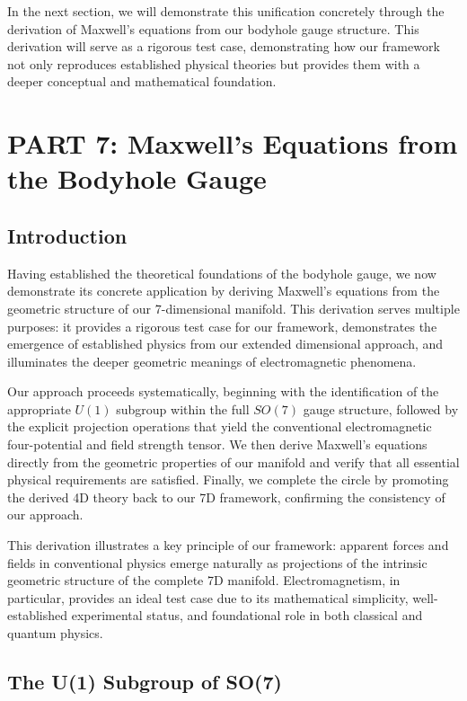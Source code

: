 \documentclass{article}
\begin{document}
In the next section, we will demonstrate this unification concretely through the derivation of Maxwell's equations from our bodyhole gauge structure. This derivation will serve as a rigorous test case, demonstrating how our framework not only reproduces established physical theories but provides them with a deeper conceptual and mathematical foundation.







\section{PART 7: Maxwell's Equations from the Bodyhole Gauge}

\subsection{Introduction}

Having established the theoretical foundations of the bodyhole gauge, we now demonstrate its concrete application by deriving Maxwell's equations from the geometric structure of our 7-dimensional manifold. This derivation serves multiple purposes: it provides a rigorous test case for our framework, demonstrates the emergence of established physics from our extended dimensional approach, and illuminates the deeper geometric meanings of electromagnetic phenomena.

Our approach proceeds systematically, beginning with the identification of the appropriate $U(1)$ subgroup within the full $SO(7)$ gauge structure, followed by the explicit projection operations that yield the conventional electromagnetic four-potential and field strength tensor. We then derive Maxwell's equations directly from the geometric properties of our manifold and verify that all essential physical requirements are satisfied. Finally, we complete the circle by promoting the derived 4D theory back to our 7D framework, confirming the consistency of our approach.

This derivation illustrates a key principle of our framework: apparent forces and fields in conventional physics emerge naturally as projections of the intrinsic geometric structure of the complete 7D manifold. Electromagnetism, in particular, provides an ideal test case due to its mathematical simplicity, well-established experimental status, and foundational role in both classical and quantum physics.

\subsection{The U(1) Subgroup of SO(7)}
\end{document}
